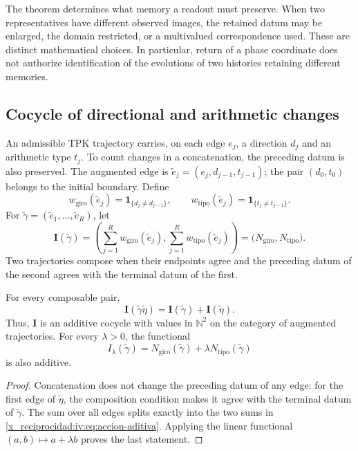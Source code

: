 The theorem determines what memory a readout
must preserve. When two representatives have different observed
images, the retained datum may be enlarged, the domain
restricted, or a multivalued correspondence used.
These are distinct mathematical choices. In particular,
return of a phase coordinate does not authorize identification
of the evolutions of two histories retaining different
memories.

\subsection{Cocycle of directional and arithmetic changes}

An admissible TPK trajectory carries, on each edge
\(e_j\), a direction \(d_j\) and an arithmetic type
\(t_j\). To count changes in a concatenation,
the preceding datum is also preserved. The augmented edge is
\(\widetilde e_j=(e_j,d_{j-1},t_{j-1})\); the pair
\((d_0,t_0)\) belongs to the initial boundary. Define
\[
 w_{\mathrm{giro}}(\widetilde e_j)
       =\mathbf1_{\{d_j\ne d_{j-1}\}},\qquad
 w_{\mathrm{tipo}}(\widetilde e_j)
       =\mathbf1_{\{t_j\ne t_{j-1}\}}.
\]
For \(\widetilde\gamma=(\widetilde e_1,\ldots,
\widetilde e_R)\), let
\begin{equation}
 \mathbf I(\widetilde\gamma)=
 \left(\sum_{j=1}^R w_{\mathrm{giro}}(\widetilde e_j),
       \sum_{j=1}^R w_{\mathrm{tipo}}(\widetilde e_j)\right)
 =\bigl(N_{\mathrm{giro}},N_{\mathrm{tipo}}\bigr).
 \label{x_reciprocidad:iv:eq:cociclo-accion}
\end{equation}
Two trajectories compose when their endpoints agree
and the preceding datum of the second agrees with the terminal
datum of the first.

\begin{proposition}
\label{x_reciprocidad:iv:prop:accion-aditiva}
For every composable pair,
\begin{equation}
 \mathbf I(\widetilde\gamma\widetilde\eta)
 =\mathbf I(\widetilde\gamma)+\mathbf I(\widetilde\eta).
 \label{x_reciprocidad:iv:eq:accion-aditiva}
\end{equation}
Thus, \(\mathbf I\) is an additive cocycle with values
in \(\mathbb N^2\) on the category of augmented
trajectories. For every \(\lambda>0\), the functional
\[
 I_\lambda(\widetilde\gamma)
 =N_{\mathrm{giro}}(\widetilde\gamma)
      +\lambda N_{\mathrm{tipo}}(\widetilde\gamma)
\]
is also additive.
\end{proposition}
\begin{proof}
Concatenation does not change the preceding datum of any
edge: for the first edge of \(\widetilde\eta\),
the composition condition makes it agree with the terminal datum
of \(\widetilde\gamma\). The sum over all edges
splits exactly into the two sums in
\eqref{x_reciprocidad:iv:eq:accion-aditiva}. Applying the linear functional
\((a,b)\mapsto a+\lambda b\) proves the last statement.
\end{proof}


